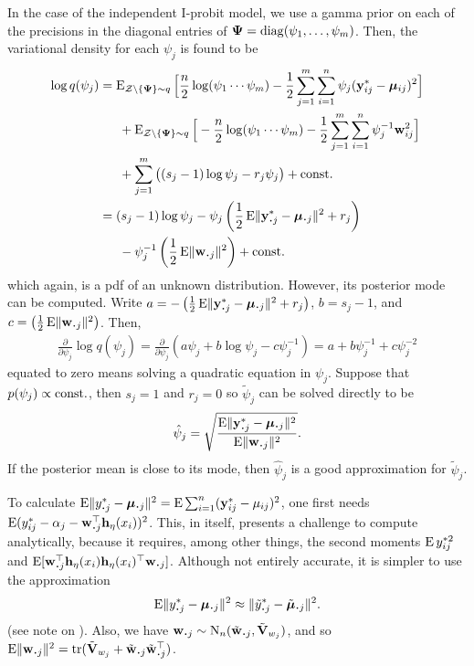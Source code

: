 In the case of the independent I-probit model, we use a gamma prior on each of the precisions in the diagonal entries of ${\bm\Psi}=\operatorname{diag}(\psi_1,\dots,\psi_m)$.
Then, the variational density for each $\psi_j$ is found to be
\begin{align*}
  \log  q(\psi_j)
  &= \E_{\cZ\backslash\{\bPsi\}\sim q} \Big[ 
  \half[n]\log (\psi_1\cdots\psi_m) - \half\sum_{j=1}^m \sum_{i=1}^n \psi_j(\by^*_{ij} - \bmu_{ij})^2 
  \Big] \\
  &\phantom{==} +\E_{\cZ\backslash\{\bPsi\}\sim q} \Big[ 
  -\half[n]\log (\psi_1\cdots\psi_m) - \half\sum_{j=1}^m \sum_{i=1}^n \psi_j^{-1} \bw_{ij}^2 
  \Big] \\
  &\phantom{==} + \sum_{j=1}^m \big( (s_j - 1)\log \psi_j - r_j\psi_j \big) + \const \\
  &= (s_j - 1)\log \psi_j 
  - \psi_j \left( \half \E\norm{\by_{\bigcdot j}^* -  \bmu_{\bigcdot j}}^2 +  r_j \right) \\
  &\phantom{==}
  - \psi_j^{-1} \left( \half\E\norm{\bw_{\bigcdot j}}^2  \right) + \const
\end{align*}
which again, is a pdf of an unknown distribution.
However, its posterior mode can be computed.
Write $a = -\left( \half \E\norm{\by_{\bigcdot j}^* -  \bmu_{\bigcdot j}}^2 + r_j \right)$,
$b = s_j - 1$, and $c=\left( \half\E\norm{\bw_{\bigcdot j}}^2  \right)$.
Then,
\begin{align*}
  \frac{\partial}{\partial\psi_j} \log q(\psi_j)
  = \frac{\partial}{\partial\psi_j} \left( a\psi_j + b\log \psi_j - c\psi_j^{-1} \right) 
  = a +b\psi_j^{-1} + c\psi_j^{-2} 
\end{align*}
equated to zero means solving a quadratic equation in $\psi_j$.
Suppose that $p(\psi_j) \propto \text{const.}\hspace{0.01em}$, then $s_j=1$ and $r_j = 0$ so $\tilde\psi_j$ can be solved directly to be
\[
  \hat\psi_j = \sqrt{\frac{ \E\norm{\by_{\bigcdot j}^* -  \bmu_{\bigcdot j}}^2 }{\E\norm{\bw_{\bigcdot j}}^2}}.
\]
If the posterior mean is close to its mode, then $\hat\psi_j$ is a good approximation for $\tilde\psi_j$.

To calculate $\E\norm{y_{\bigcdot j}^* -  \bmu_{\bigcdot j}}^2 = \E \sum_{i=1}^n (\by_{ij}^* - \mu_{ij})^2$, one first needs $\E (y_{ij}^* - \alpha_j - \bw_{\bigcdot j}^\top\bh_\eta(x_i))^2$.
This, in itself, presents a challenge to compute analytically, because it requires, among other things, the second moments $\operatorname{E} y_{ij}^{*2}$ and $\E [\bw_{\bigcdot j}^\top\bh_\eta(x_i)\bh_\eta(x_i)^\top \bw_{\bigcdot j}]$.
Although not entirely accurate, it is simpler to use the approximation
\[
  \E\norm{y_{\bigcdot j}^* -  \bmu_{\bigcdot j}}^2 \approx 
  \norm{\tilde y_{\bigcdot j}^* -  \tilde \bmu_{\bigcdot j}}^2.
\]
(see note on ).
Also, we have $\bw_{\bigcdot j} \sim \N_n(\tilde\bw_{\bigcdot j}, \tilde\bV_{w_j})$, and so $  \E\norm{\bw_{\bigcdot j}}^2 = \tr(\tilde\bV_{w_j} + \tilde\bw_{\bigcdot j}\tilde\bw_{\bigcdot j}^\top)$.

